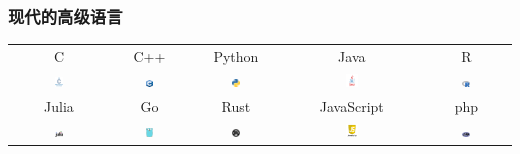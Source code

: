 \documentclass[10pt]{beamer}
\begin{document}
\begin{frame}
\frametitle{现代的高级语言}

\begin{table}
    \centering
    \begin{tabular}{ccccc}
    C &  C++ & Python & Java & R \\
    \includegraphics[width=0.1\textwidth]{figures/C.png} &
    \includegraphics[width=0.1\textwidth]{figures/C++.png} & 
    \includegraphics[width=0.1\textwidth]{figures/python.png} & \includegraphics[width=0.1\textwidth]{figures/java.png} &
    \includegraphics[width=0.1\textwidth]{figures/R.png} \\
    Julia &  Go  & Rust & JavaScript & php \\
    \includegraphics[width=0.1\textwidth]{figures/julia.png} &
    \includegraphics[width=0.1\textwidth]{figures/go.png} & 
    \includegraphics[width=0.1\textwidth]{figures/rust.png} & \includegraphics[width=0.1\textwidth]{figures/javascript.png} &
    \includegraphics[width=0.1\textwidth]{figures/php.png}
    \end{tabular}
\end{table}


\end{frame}
\end{document}
